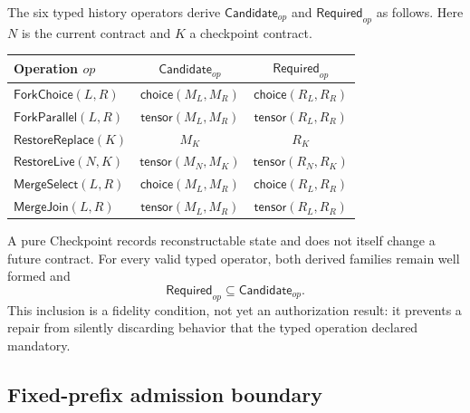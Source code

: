 The six typed history operators derive
$\mathsf{Candidate}_{op}$ and $\mathsf{Required}_{op}$ as follows.  Here $N$
is the current contract and $K$ a checkpoint contract.
\begin{center}
\small
\begin{tabular}{@{}lcc@{}}
  \toprule
  Operation $op$ & $\mathsf{Candidate}_{op}$ & $\mathsf{Required}_{op}$ \\
  \midrule
  $\mathsf{ForkChoice}(L,R)$
    & $\mathsf{choice}(M_L,M_R)$
    & $\mathsf{choice}(R_L,R_R)$ \\
  $\mathsf{ForkParallel}(L,R)$
    & $\mathsf{tensor}(M_L,M_R)$
    & $\mathsf{tensor}(R_L,R_R)$ \\
  $\mathsf{RestoreReplace}(K)$
    & $M_K$ & $R_K$ \\
  $\mathsf{RestoreLive}(N,K)$
    & $\mathsf{tensor}(M_N,M_K)$
    & $\mathsf{tensor}(R_N,R_K)$ \\
  $\mathsf{MergeSelect}(L,R)$
    & $\mathsf{choice}(M_L,M_R)$
    & $\mathsf{choice}(R_L,R_R)$ \\
  $\mathsf{MergeJoin}(L,R)$
    & $\mathsf{tensor}(M_L,M_R)$
    & $\mathsf{tensor}(R_L,R_R)$ \\
  \bottomrule
\end{tabular}
\end{center}
A pure Checkpoint records reconstructable state and does not itself change a
future contract.  For every valid typed operator, both derived families remain
well formed and
\[
  \mathsf{Required}_{op}\subseteq\mathsf{Candidate}_{op}.
\]
This inclusion is a fidelity condition, not yet an authorization result: it
prevents a repair from silently discarding behavior that the typed operation
declared mandatory.

\subsection{Fixed-prefix admission boundary}

